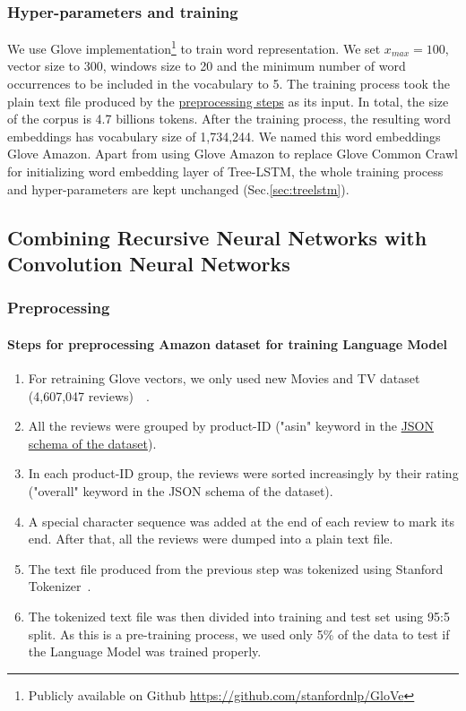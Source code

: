 \subsubsection{Hyper-parameters and training}
We use Glove implementation\footnote{Publicly available on Github \url{https://github.com/stanfordnlp/GloVe}} to train word representation.
We set $x_{max} = 100$, vector size to 300, windows size to 20 and the minimum number of word occurrences to be included in the vocabulary to  5.
The training process took the plain text file produced by the \hyperref[sec:preprocessamazonglove]{preprocessing steps} as its input.
In total, the size of the corpus is 4.7 billions tokens.
After the training process, the resulting word embeddings has vocabulary size of 1,734,244.
We named this word embeddings Glove Amazon.
Apart from using Glove Amazon to replace Glove Common Crawl for initializing word embedding layer of Tree-LSTM, the whole training process and hyper-parameters are kept unchanged (Sec.\ref{sec:treelstm}).

\subsection{Combining Recursive Neural Networks with Convolution Neural Networks}
\subsubsection{Preprocessing}
\paragraph{Steps for preprocessing Amazon dataset for training Language Model}
\label{sec:preprocessamazonglove-LM}
\begin{enumerate}
\item For retraining Glove vectors, we only used new Movies and TV dataset (4,607,047 reviews)~\cite{McAuleyTSH15}~\cite{HeM16}.
\item All the reviews were grouped by product-ID ("asin" keyword in the \hyperref[sec:amazon]{JSON schema of the dataset}).
\item In each product-ID group, the reviews were sorted increasingly by their rating ("overall" keyword in the JSON schema of the dataset).
\item A special character sequence was added at the end of each review to mark its end.
After that, all the reviews were dumped into a plain text file.
\item The text file produced from the previous step was tokenized using Stanford Tokenizer~\cite{tokenizerpart}.
\item The tokenized text file was then divided into training and test set using 95:5 split.
As this is a pre-training process, we used only 5\% of the data to test if the Language Model was trained properly.
\end{enumerate}

